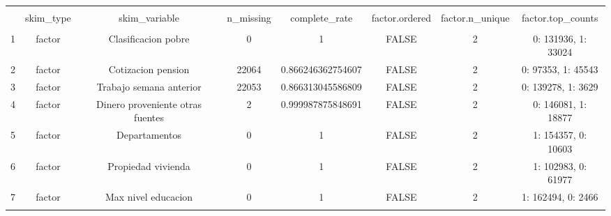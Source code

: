 
\begin{table}[!htbp] \centering 
  \caption{} 
  \label{} 
\begin{tabular}{@{\extracolsep{5pt}} cccccccc} 
\\[-1.8ex]\hline 
\hline \\[-1.8ex] 
 & skim\_type & skim\_variable & n\_missing & complete\_rate & factor.ordered & factor.n\_unique & factor.top\_counts \\ 
\hline \\[-1.8ex] 
1 & factor & Clasificacion pobre & 0 & 1 & FALSE & 2 & 0: 131936, 1: 33024 \\ 
2 & factor & Cotizacion pension & 22064 & 0.866246362754607 & FALSE & 2 & 0: 97353, 1: 45543 \\ 
3 & factor & Trabajo semana anterior & 22053 & 0.866313045586809 & FALSE & 2 & 0: 139278, 1: 3629 \\ 
4 & factor & Dinero proveniente otras fuentes & 2 & 0.999987875848691 & FALSE & 2 & 0: 146081, 1: 18877 \\ 
5 & factor & Departamentos & 0 & 1 & FALSE & 2 & 1: 154357, 0: 10603 \\ 
6 & factor & Propiedad vivienda & 0 & 1 & FALSE & 2 & 1: 102983, 0: 61977 \\ 
7 & factor & Max nivel educacion & 0 & 1 & FALSE & 2 & 1: 162494, 0: 2466 \\ 
\hline \\[-1.8ex] 
\end{tabular} 
\end{table} 
